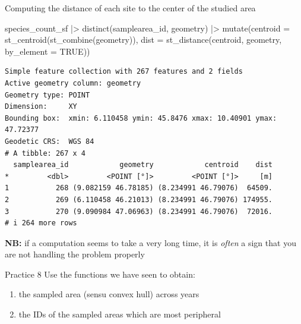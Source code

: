 \documentclass[
  ignorenonframetext,
  aspectratio=169,
]{beamer}
\newenvironment{Shaded}{\begin{snugshade}}{\end{snugshade}}
\newcommand{\AttributeTok}[1]{\textcolor[rgb]{0.40,0.45,0.13}{#1}}
\newcommand{\ConstantTok}[1]{\textcolor[rgb]{0.56,0.35,0.01}{#1}}
\newcommand{\FunctionTok}[1]{\textcolor[rgb]{0.28,0.35,0.67}{#1}}
\newcommand{\NormalTok}[1]{\textcolor[rgb]{0.00,0.23,0.31}{#1}}
\newcommand{\SpecialCharTok}[1]{\textcolor[rgb]{0.37,0.37,0.37}{#1}}
\providecommand{\tightlist}{%
  \setlength{\itemsep}{0pt}\setlength{\parskip}{0pt}}
\begin{document}
\begin{frame}[fragile]{Computing the distance of each site to the center
of the studied area}
\protect{}\label{computing-the-distance-of-each-site-to-the-center-of-the-studied-area}
\scriptsize

\begin{Shaded}
\begin{Highlighting}[]
\NormalTok{species\_count\_sf }\SpecialCharTok{|\textgreater{}} 
  \FunctionTok{distinct}\NormalTok{(samplearea\_id, geometry) }\SpecialCharTok{|\textgreater{}} 
  \FunctionTok{mutate}\NormalTok{(}\AttributeTok{centroid =} \FunctionTok{st\_centroid}\NormalTok{(}\FunctionTok{st\_combine}\NormalTok{(geometry)),}
         \AttributeTok{dist =} \FunctionTok{st\_distance}\NormalTok{(centroid, geometry, }\AttributeTok{by\_element =} \ConstantTok{TRUE}\NormalTok{))}
\end{Highlighting}
\end{Shaded}

\begin{verbatim}
Simple feature collection with 267 features and 2 fields
Active geometry column: geometry
Geometry type: POINT
Dimension:     XY
Bounding box:  xmin: 6.110458 ymin: 45.8476 xmax: 10.40901 ymax: 47.72377
Geodetic CRS:  WGS 84
# A tibble: 267 x 4
  samplearea_id            geometry            centroid    dist
*         <dbl>         <POINT [°]>         <POINT [°]>     [m]
1           268 (9.082159 46.78185) (8.234991 46.79076)  64509.
2           269 (6.110458 46.21013) (8.234991 46.79076) 174955.
3           270 (9.090984 47.06963) (8.234991 46.79076)  72016.
# i 264 more rows
\end{verbatim}

\normalsize

\textbf{NB:} if a computation seems to take a very long time, it is
\emph{often} a sign that you are not handling the problem properly
\end{frame}

\begin{frame}{Practice 8}
\protect{}\label{practice-8}
Use the functions we have seen to obtain:

\begin{enumerate}
\tightlist
\item
  the sampled area (sensu convex hull) across years
\item
  the IDs of the sampled areas which are most peripheral
\end{enumerate}
\end{frame}
\end{document}

